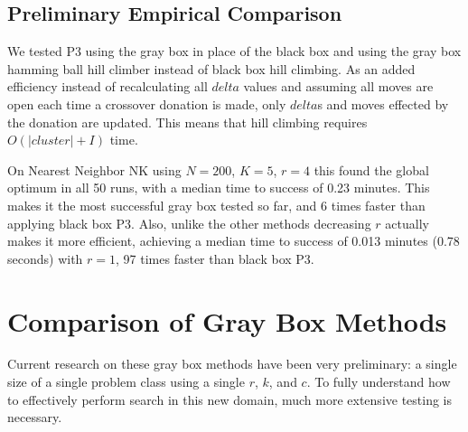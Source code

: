 \subsection{Preliminary Empirical Comparison}
We tested P3 using the gray box  in place of the black box 
and using the gray box hamming ball hill climber instead of black box hill climbing. As an added efficiency
instead of recalculating all $delta$ values and assuming all moves are open each time a crossover donation is made,
only $delta$s and moves effected by the donation are updated. This means that hill climbing requires $O(|cluster|+I)$
time.

On Nearest Neighbor NK using
$N=200$, $K=5$, $r=4$ this found the global optimum in all 50 runs, with a median time to success of 0.23 minutes. This makes it the
most successful gray box tested so far, and 6 times faster than applying black box P3. Also, unlike the other
methods decreasing $r$ actually makes it more efficient, achieving a median time to success of 0.013 minutes (0.78 seconds) with $r=1$,
97 times faster than black box P3.
\section{Comparison of Gray Box Methods}

Current research on these gray box methods have been very preliminary: a single size of a single problem class using
a single $r$, $k$, and $c$. To fully understand how to effectively perform search in this new domain, much more extensive testing
is necessary.

